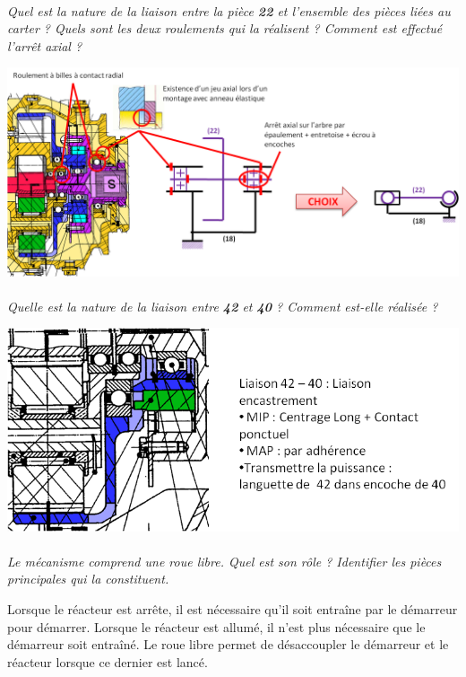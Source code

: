 \documentclass[11pt,oneside]{article}
\begin{document}
\paragraph{}
\textit{Quel est la nature de la liaison entre la pièce \textbf{22} et l'ensemble des pièces liées au carter ? Quels sont les deux roulements qui la réalisent ? Comment est effectué l'arrêt axial ?}

\begin{center}
\includegraphics[width=.95\textwidth]{png/22}
\end{center}

\paragraph{}
\textit{Quelle est la nature de la liaison entre \textbf{42} et \textbf{40} ? Comment est-elle réalisée ?}

\begin{center}
\includegraphics[width=.45\textwidth]{png/42}
\end{center}

\paragraph{}
\textit{Le mécanisme comprend une roue libre. Quel est son rôle ? Identifier les pièces principales qui la constituent.}

Lorsque le réacteur est arrête, il est nécessaire qu'il soit entraîne par le démarreur pour démarrer. Lorsque le réacteur est allumé, il n'est plus nécessaire que le démarreur soit entraîné. Le roue libre permet de désaccoupler le démarreur et le réacteur lorsque ce dernier est lancé. 
\end{document}

